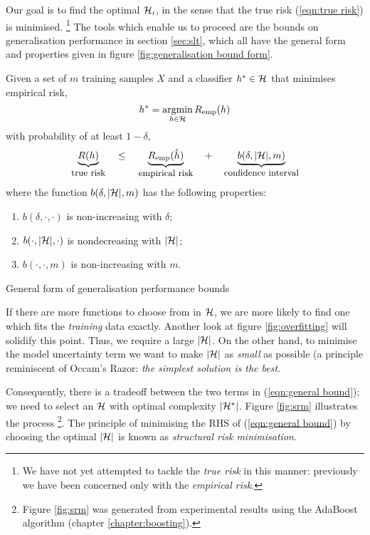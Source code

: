 Our goal is to find the optimal $\mathcal{H}_i$, in the sense that the
true risk (\ref{eqn:true risk}) is minimised.
\footnote{We have not yet attempted to tackle the \emph{true risk} in
this manner: previously we have been concerned only with the
\emph{empirical risk}.}
The tools which enable us to proceed are the bounds on generalisation
performance in section \ref{sec:slt}, which all have the general form
and properties given in figure \ref{fig:generalisation bound form}.

\begin{linefigure}
Given a set of $m$ training samples $X$ and a classifier $h^{\ast} \in
\mathcal{H}$ that minimises empirical risk,
\begin{equation*}
h^{\ast} = \argmin_{h \in
\calH} R_{\emp}(h)
\end{equation*}
with probability of at least $1 - \delta$,
%
\begin{equation}
\underbrace{R(h)}_{\mbox{\small{true risk}}}
\quad \leq \quad
\underbrace{R_{\mathrm{emp}}(\hat{h})}_{\mbox{\small{empirical risk}}}
\quad + \quad
\underbrace{b(\delta, |\mathcal{H}|, m)}_{\mbox{\small{confidence interval}}}
\label{eqn:general bound}
\end{equation}
%
where the function $b(\delta, |\mathcal{H}|, m)$ has the following
properties:
%
\begin{enumerate}
\item	$b(\delta, \cdot, \cdot)$ is non-increasing with $\delta$;
\item	$b(\cdot, |\mathcal{H}|, \cdot)$ is nondecreasing with $|\mathcal{H}|$;
\item	$b(\cdot, \cdot, m)$ is non-increasing with $m$.
\end{enumerate}
\caption{General form of generalisation performance bounds}
\label{fig:generalisation bound form}
\end{linefigure}

If there are more functions to choose from in $\mathcal{H}$, we
are more likely to find one which fits the \emph{training} data
exactly.  Another look at figure \ref{fig:overfitting} will solidify
this point.  Thus, we require a large $|\mathcal{H}|$.  On the other hand,
to minimise the model uncertainty term we want to make $|\mathcal{H}|$ as
\emph{small} as possible (a principle reminiscent of Occam's Razor:
\emph{the simplest solution is the best}.

Consequently, there is a tradeoff between the two terms in
(\ref{eqn:general bound}); we need to select an $\mathcal{H}$ with optimal
complexity $|\mathcal{H}^{\ast}|$. Figure \ref{fig:srm} illustrates the
process%
\footnote{Figure \ref{fig:srm} was generated from experimental results
using the AdaBoost algorithm (chapter \ref{chapter:boosting}).}.
The principle of minimising the RHS of (\ref{eqn:general bound}) by
choosing the optimal $|\mathcal{H}|$ is known as \emph{structural risk
minimisation}.

